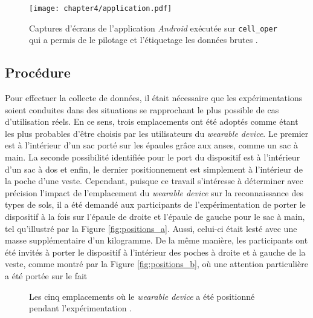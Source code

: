 \begin{figure}[H]
	\centering
	\texttt{[image: chapter4/application.pdf]}
        \caption[Captures d'écrans de l'application \textit{Android} exécutée sur \texttt{cell\_oper} qui a permis de le pilotage et l'étiquetage les données brutes.]{Captures d'écrans de l'application \textit{Android} exécutée sur \texttt{cell\_oper} qui a permis de le pilotage et l'étiquetage les données brutes \citep{Thullier2017}.}
	\label{fig:application}
\end{figure}

\subsection{Procédure}
Pour effectuer la collecte de données, il était nécessaire que les expérimentations soient conduites dans des situations se rapprochant le plus possible de cas d'utilisation réels. En ce sens, trois emplacements ont été adoptés comme étant les plus probables d'être choisis par les utilisateurs du \textit{wearable device}. Le premier est à l'intérieur d'un sac porté sur les épaules grâce aux anses, comme un sac à main. La seconde possibilité identifiée pour le port du dispositif est à l'intérieur d'un sac à dos et enfin, le dernier positionnement est simplement à l'intérieur de la poche d'une veste. Cependant, puisque ce travail s'intéresse à déterminer avec précision l'impact de l'emplacement du \textit{wearable device} sur la reconnaissance des types de sols, il a été demandé aux participants de l'expérimentation de porter le dispositif à la fois sur l'épaule de droite et l'épaule de gauche pour le sac à main, tel qu'illustré par la Figure \ref{fig:positions_a}. Aussi, celui-ci était lesté avec une masse supplémentaire d'un kilogramme. De la même manière, les participants ont été invités à porter le dispositif à l'intérieur des poches à droite et à gauche de la veste, comme montré par la Figure \ref{fig:positions_b}, où une attention particulière a été portée sur le fait

\begin{figure}[H]
	\centering
	\hspace*{\fill}
    \caption[Les cinq emplacements où le \textit{wearable device} a été positionné pendant l'expérimentation.]{Les cinq emplacements où le \textit{wearable device} a été positionné pendant l'expérimentation \citep{Thullier2017}.}
    \label{fig:positions}
\end{figure}

